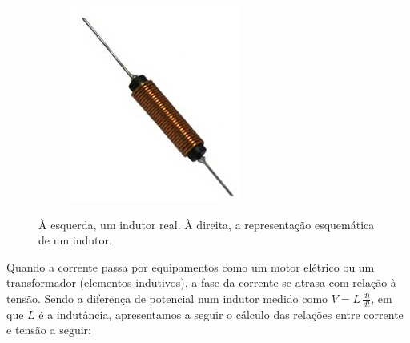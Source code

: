 \begin{figure}
    \centering
    \begin{subfigure}[b]{0.3\textwidth}
        \centering
        \includegraphics[width=\textwidth]{anexos/indutor.png}
    \end{subfigure}
    \hspace{1cm}
    \begin{subfigure}[b]{0.3\textwidth}
        \centering
    \end{subfigure}
    \caption{À esquerda, um indutor real. À direita, a representação esquemática de um indutor.}
    \label{fig:three graphs}
\end{figure}


Quando a corrente passa por equipamentos como um motor elétrico ou
um transformador (elementos indutivos), a fase da corrente se atrasa
com relação à tensão. Sendo a diferença de potencial num indutor medido
como $V=L\,\frac{di}{dt}$, em que $L$ é a indutância, apresentamos a seguir o cálculo das relações
entre corrente e tensão a seguir:

